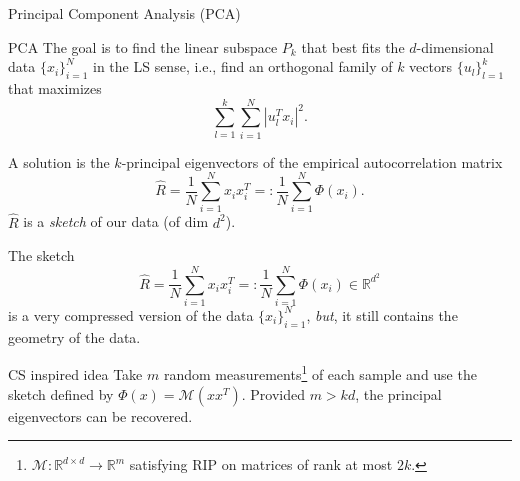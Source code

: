 \begin{frame}{Principal Component Analysis (PCA)}
	\begin{block}{PCA}
		The goal is to find the linear subspace $P_k$ that best fits the $d$-dimensional data $\{x_i\}_{i=1}^N$ in the LS sense, i.e., find an orthogonal family of $k$ vectors $\{u_l\}_{l=1}^k$ that maximizes
		\begin{equation*}
				\sum_{l=1}^k\sum_{i=1}^N |u_l^Tx_i|^2.
		\end{equation*}
	\end{block}
	A solution is the $k$-principal eigenvectors of the empirical autocorrelation matrix
	\begin{equation*}
		\hat{R} = \frac{1}{N}\sum_{i=1}^N x_ix_i^T =: \frac{1}{N}\sum_{i=1}^N \Phi(x_i).
	\end{equation*}
	$\hat{R}$ is a \emph{sketch} of our data (of dim $d^2$).
\end{frame}


\begin{frame}
	The sketch 
	\begin{equation*}
		\hat{R} = \frac{1}{N}\sum_{i=1}^N x_ix_i^T =: \frac{1}{N}\sum_{i=1}^N \Phi(x_i) \in \mathbb{R}^{d^2}
	\end{equation*}
 	is a very compressed version of the data $\{x_i\}_{i=1}^N$, \emph{but}, it still contains the geometry of the data.
	\begin{block}{CS inspired idea}
		Take $m$ random measurements\footnote{$\mathcal{M}:\mathbb{R}^{d\times d}\to \mathbb{R}^m$ satisfying RIP on matrices of rank at most $2k$.} of each sample and use the sketch defined by $\Phi(x) = \mathcal{M}(xx^T)$. Provided $m>kd$, the principal eigenvectors can be recovered.
	\end{block}

\end{frame}